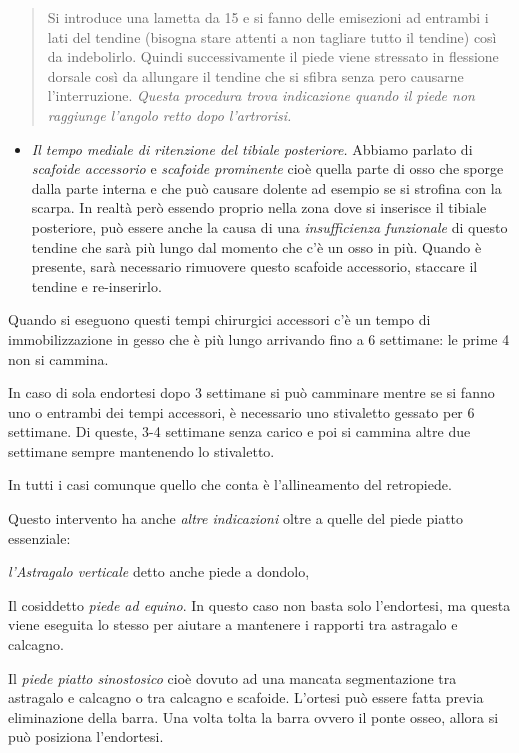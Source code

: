 \documentclass[]{article}
\begin{document}
\begin{quote}
Si introduce una lametta da 15 e si fanno delle emisezioni ad entrambi i
lati del tendine (bisogna stare attenti a non tagliare tutto il tendine)
così da indebolirlo. Quindi successivamente il piede viene stressato in
flessione dorsale così da allungare il tendine che si sfibra senza pero
causarne l'interruzione. \emph{Questa procedura trova indicazione quando
il piede non raggiunge l'angolo retto dopo l'artrorisi.}
\end{quote}

\begin{itemize}
\item
  \emph{Il tempo mediale di ritenzione del tibiale posteriore.} Abbiamo
  parlato di \emph{scafoide accessorio} e \emph{scafoide prominente}
  cioè quella parte di osso che sporge dalla parte interna e che può
  causare dolente ad esempio se si strofina con la scarpa. In realtà
  però essendo proprio nella zona dove si inserisce il tibiale
  posteriore, può essere anche la causa di una \emph{insufficienza
  funzionale} di questo tendine che sarà più lungo dal momento che c'è
  un osso in più. Quando è presente, sarà necessario rimuovere questo
  scafoide accessorio, staccare il tendine e re-inserirlo.
\end{itemize}

Quando si eseguono questi tempi chirurgici accessori c'è un tempo di
immobilizzazione in gesso che è più lungo arrivando fino a 6 settimane:
le prime 4 non si cammina.

In caso di sola endortesi dopo 3 settimane si può camminare mentre se si
fanno uno o entrambi dei tempi accessori, è necessario uno stivaletto
gessato per 6 settimane. Di queste, 3-4 settimane senza carico e poi si
cammina altre due settimane sempre mantenendo lo stivaletto.

In tutti i casi comunque quello che conta è l'allineamento del
retropiede.

Questo intervento ha anche \emph{altre indicazioni} oltre a quelle del
piede piatto essenziale:

\emph{l'Astragalo verticale} detto anche piede a dondolo,

Il cosiddetto \emph{piede ad equino}. In questo caso non basta solo
l'endortesi, ma questa viene eseguita lo stesso per aiutare a mantenere
i rapporti tra astragalo e calcagno.

Il \emph{piede piatto sinostosico} cioè dovuto ad una mancata
segmentazione tra astragalo e calcagno o tra calcagno e scafoide.
L'ortesi può essere fatta previa eliminazione della barra. Una volta
tolta la barra ovvero il ponte osseo, allora si può posiziona
l'endortesi.
\end{document}
